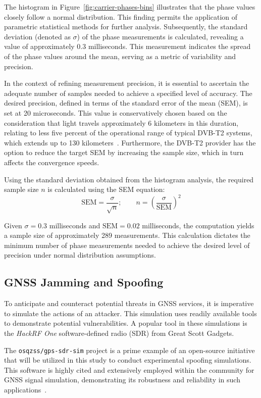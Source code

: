 \documentclass[12pt, a4paper]{extarticle}
\begin{document}
The histogram in Figure~\ref{fig:carrier-phases-bins} illustrates that the
phase values closely follow a normal distribution. This finding permits the
application of parametric statistical methods for further analysis.
Subsequently, the standard deviation (denoted as \(\sigma\)) of the phase
measurements is calculated, revealing a value of approximately 0.3
milliseconds. This measurement indicates the spread of the phase values around
the mean, serving as a metric of variability and precision.

In the context of refining measurement precision, it is essential to ascertain
the adequate number of samples needed to achieve a specified level of accuracy.
The desired precision, defined in terms of the standard error of the mean
(SEM), is set at 20 microseconds. This value is conservatively chosen based on
the consideration that light travels approximately 6 kilometers in this
duration, relating to less five percent of the operational range of typical
DVB-T2 systems, which extends up to 130 kilometers~\cite{lstelecom}. Furthermore,
the DVB-T2 provider has the option to reduce the target SEM by increasing the
sample size, which in turn affects the convergence speeds.

Using the standard deviation obtained from the
histogram analysis, the required sample size \(n\) is
calculated using the SEM equation:
\[
    \text{SEM} = \frac{\sigma}{\sqrt{n}};
\hspace{2em}
   n = \left(\frac{\sigma}{\text{SEM}}\right)^2
\]

Given \(\sigma = 0.3\) milliseconds and \(\text{SEM} = 0.02\) milliseconds, the
computation yields a sample size of approximately 289 measurements. This
calculation dictates the minimum number of phase measurements needed to achieve
the desired level of precision under normal distribution assumptions.

\pagebreak

\subsection{GNSS Jamming and Spoofing}

To anticipate and counteract potential threats in GNSS services, it is
imperative to simulate the actions of an attacker. This simulation uses readily
available tools to demonstrate potential vulnerabilities. A popular tool in
these simulations is the \textit{HackRF One} software-defined radio (SDR) from Great
Scott Gadgets.

The \texttt{osqzss/gps-sdr-sim} project is a prime example of an open-source
initiative that will be utilized in this study to conduct experimental spoofing
simulations. This software is highly cited and extensively employed within the
community for GNSS signal simulation, demonstrating its robustness and
reliability in such applications~\cite{gps-sdr-sim,spoofing1}.
\end{document}
